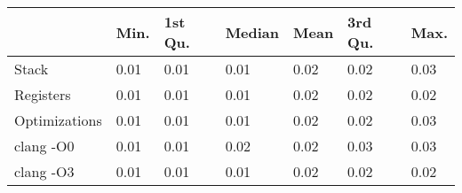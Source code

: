 \begin{table}[ht]
\centering
\begin{tabular}{p{}p{}p{}p{}p{}p{}p{}}
  \hline
 & Min. & 1st Qu. & Median & Mean & 3rd Qu. & Max. \\ 
  \hline
Stack & 0.01 & 0.01 & 0.01 & 0.02 & 0.02 & 0.03 \\ 
  Registers & 0.01 & 0.01 & 0.01 & 0.02 & 0.02 & 0.02 \\ 
  Optimizations & 0.01 & 0.01 & 0.01 & 0.02 & 0.02 & 0.03 \\ 
  clang -O0 & 0.01 & 0.01 & 0.02 & 0.02 & 0.03 & 0.03 \\ 
  clang -O3 & 0.01 & 0.01 & 0.01 & 0.02 & 0.02 & 0.02 \\ 
   \hline
\end{tabular}
\end{table}
